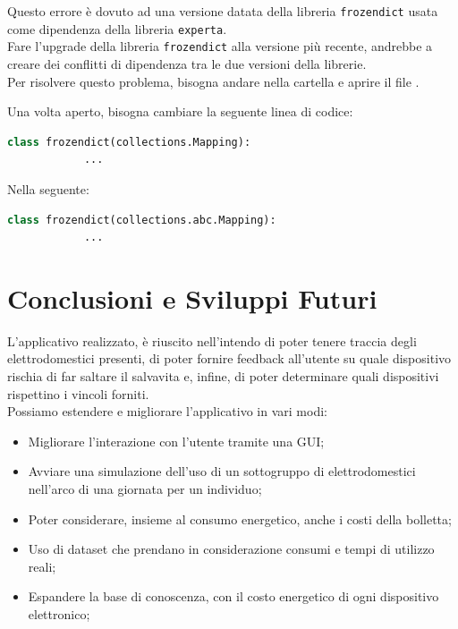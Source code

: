 \documentclass[12pt, letterpaper]{article}
\begin{document}
\noindent Questo errore è dovuto ad una versione datata della libreria \texttt{frozendict}
usata come dipendenza della libreria \texttt{experta}. \\

\noindent Fare l'upgrade della libreria \texttt{frozendict} alla versione più recente, andrebbe a
creare dei conflitti di dipendenza tra le due versioni della librerie. \\

\noindent Per risolvere questo problema, bisogna andare nella cartella
 e aprire il file .

\noindent Una volta aperto, bisogna cambiare la seguente linea di codice: \\

\begin{lstlisting}[language=Python]
      class frozendict(collections.Mapping):
            ...
\end{lstlisting}

Nella seguente:

\begin{lstlisting}[language=Python]
      class frozendict(collections.abc.Mapping):
            ...
\end{lstlisting}

\section{Conclusioni e Sviluppi Futuri}

L'applicativo realizzato, è riuscito nell'intendo di poter tenere traccia degli elettrodomestici
presenti, di poter fornire feedback all'utente su quale dispositivo rischia di far saltare il salvavita
e, infine, di poter determinare quali dispositivi rispettino i vincoli forniti. \\

\noindent Possiamo estendere e migliorare l'applicativo in vari modi:
\begin{itemize}
      \item Migliorare l'interazione con l'utente tramite una GUI;
      \item Avviare una simulazione dell'uso di un sottogruppo di elettrodomestici
            nell'arco di una giornata per un individuo;
      \item Poter considerare, insieme al consumo energetico, anche i costi della bolletta;
      \item Uso di dataset che prendano in considerazione consumi e tempi di utilizzo reali;
      \item Espandere la base di conoscenza, con il costo energetico di ogni dispositivo elettronico;
\end{itemize}
\end{document}
